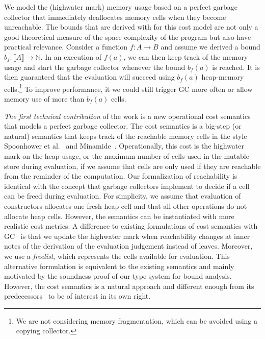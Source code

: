 \documentclass{easychair}
\newcommand{\denote}[1]{\llbracket#1\rrbracket}
\theoremstyle{definition}
\begin{document}
We model the (highwater mark) memory
usage based on a perfect garbage collector that immediately
deallocates memory cells when they become unreachable. The bounds that
are derived with for this cost model are not only a good theoretical
measure of the space complexity of the program but also have practical
relevance. Consider a function $f : A \to B$ and assume we derived a
bound $b_f : \denote{A} \to \mathbb{N}$. In an execution of $f(a)$, we
can then keep track of the memory usage and start the garbage
collector whenever the bound $b_f(a)$ is reached. It is then
guaranteed that the evaluation will succeed using $b_f(a)$ heap-memory
cells.\footnote{We are not considering memory fragmentation, which
  can be avoided using a copying collector.} To improve performance,
it we could still trigger GC more often or allow memory use of more
than $b_f(a)$ cells.

\emph{The first technical contribution} of the work is a new
operational cost semantics that models a perfect garbage collector.
%
The cost semantics is a big-step (or natural) semantics that keeps
track of the reachable memory cells in the style Spoonhower et
al.~\cite{Spoonhower:2008:SPP:1411204.1411240} and
Minamide~\cite{DBLP:journals/entcs/Minamide99}. Operationally, this
cost is the highwater mark on the heap usage, or the maximum number of
cells used in the mutable store during evaluation, if we assume that
cells are only used if they are reachable from the reminder of the
computation. Our formalization of reachability is identical with the
concept that garbage collectors implement to decide if a cell can be
freed during evaluation. For simplicity, we assume that evaluation of
constructors allocates one fresh heap cell and that all other
operations do not allocate heap cells. However, the semantics can be
instantiated with more realistic cost metrics. A difference to
existing formulations of cost semantics with
GC~\cite{Spoonhower:2008:SPP:1411204.1411240,DBLP:journals/entcs/Minamide99}
is that we update the highwater mark when reachability changes at
inner notes of the derivation of the evaluation judgement instead of
leaves. Moreover, we use a \emph{freelist}, which represents the
cells available for evaluation. This alternative formulation is
equivalent to the existing semantics and mainly motivated by the
soundness proof of our type system for bound analysis.  However, the
cost semantics is a natural approach and different enough from its
predecessors~\cite{Spoonhower:2008:SPP:1411204.1411240,DBLP:journals/entcs/Minamide99}
to be of interest in its own right.
\end{document}
